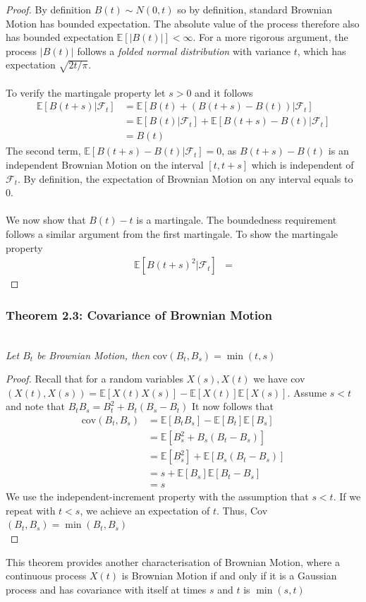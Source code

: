 \documentclass{article}
\begin{document}
\begin{proof}
By definition $B(t)\sim N(0,t)$ so by definition, standard Brownian Motion has bounded expectation. The absolute value of the process therefore also has bounded expectation $\mathbb{E}[|B(t)|]<\infty$. For a more rigorous argument, the process $|B(t)|$ follows a \textit{folded normal distribution} with variance $t$, which has expectation $\sqrt{2t/\pi}$. \\
\\
To verify the martingale property let $s>0$ and it follows
\begin{align*}
    \mathbb{E}[B(t+s)|\mathcal{F}_t] &= \mathbb{E}[B(t)+(B(t+s)-B(t))|\mathcal{F}_t] \\
    &= \mathbb{E}[B(t)|\mathcal{F}_t] + \mathbb{E}[B(t+s)-B(t)|\mathcal{F}_t] \\
    &= B(t)
\end{align*}
The second term, $\mathbb{E}[B(t+s)-B(t)|\mathcal{F}_t]=0$, as $B(t+s)-B(t)$ is an independent Brownian Motion on the interval $[t, t+s]$ which is independent of $\mathcal{F}_t$. By definition, the expectation of Brownian Motion on any interval equals to 0.\\
\\
We now show that $B(t)-t$ is a martingale. The boundedness requirement follows a similar argument from the first martingale. To show the martingale property \begin{align*}
    \mathbb{E}[B(t+s)^2 | \mathcal{F}_t] &= 
\end{align*} 
\end{proof}
\subsubsection*{Theorem 2.3: Covariance of Brownian Motion}\\
\textit{Let $B_t$ be Brownian Motion, then }$\text{cov}(B_t, B_s) = \min (t,s)$
\begin{proof}
Recall that for a random variables $X(s), X(t)$ we have cov$(X(t), X(s)) = \mathbb{E}[X(t)X(s)]-\mathbb{E}[X(t)]\mathbb{E}[X(s)]$. Assume $s<t$ and note that 
$B_t B_s = B_t^2+B_t(B_s - B_t)$ It now follows that \begin{align*}
    \text{cov}(B_t, B_s) &= \mathbb{E}[B_t B_s] - \mathbb{E}[B_t]\mathbb{E}[B_s] \\
    &= \mathbb{E}[B_s^2+B_s(B_t - B_s)] \\
    &= \mathbb{E}[B_s^2] + \mathbb{E}[B_s(B_t - B_s)] \\
    &= s + \mathbb{E}[B_s]\mathbb{E}[B_t - B_s] \\
    &= s
\end{align*}
We use the independent-increment property with the assumption that $s<t$. If we repeat with $t<s$, we achieve an expectation of $t$. Thus, Cov$(B_t, B_s) = \min(B_t, B_s)$ \\
\end{proof}
This theorem provides another characterisation of Brownian Motion, where a continuous process $X(t)$ is Brownian Motion if and only if it is a Gaussian process and has covariance with itself at times $s$ and $t$ is $\min(s,t)$
\end{document}
